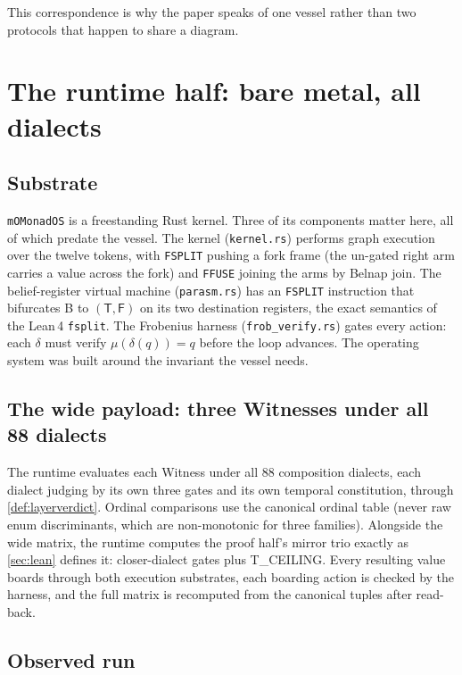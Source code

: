 \documentclass[12pt,a4paper]{article}
\newcommand{\Lean}{\textsf{Lean}\,4}
\newcommand{\bT}{\textsf{T}}
\newcommand{\bF}{\textsf{F}}
\newcommand{\bB}{\textsf{B}}
\begin{document}
This correspondence is why the paper speaks of one vessel rather than two
protocols that happen to share a diagram.

\section{The runtime half: bare metal, all dialects}
\label{sec:runtime}

\subsection{Substrate}

\texttt{mOMonadOS} is a freestanding Rust kernel.  Three of its components
matter here, all of which predate the vessel.  The kernel (\texttt{kernel.rs})
performs graph execution over the twelve tokens, with \texttt{FSPLIT} pushing a
fork frame (the un-gated right arm carries a value across the fork) and
\texttt{FFUSE} joining the arms by Belnap join.  The belief-register virtual
machine (\texttt{parasm.rs}) has an \texttt{FSPLIT} instruction that bifurcates
\bB{} to $(\bT, \bF)$ on its two destination registers, the exact semantics of
the \Lean{} \texttt{fsplit}.  The Frobenius harness (\texttt{frob\_verify.rs})
gates every action: each $\delta$ must verify $\mu(\delta(q)) = q$ before the
loop advances.  The operating system was built around the invariant the vessel
needs.

\subsection{The wide payload: three Witnesses under all 88 dialects}

The runtime evaluates each Witness under all $88$ composition dialects, each
dialect judging by its own three gates and its own temporal constitution,
through \cref{def:layerverdict}.  Ordinal comparisons use the canonical ordinal
table (never raw enum discriminants, which are non-monotonic for three families).
Alongside the wide matrix, the runtime computes the proof half's mirror trio
exactly as \cref{sec:lean} defines it: closer-dialect gates plus T\_CEILING.
Every resulting value boards through both execution substrates, each boarding
action is checked by the harness, and the full matrix is recomputed from the
canonical tuples after read-back.

\subsection{Observed run}
\end{document}
